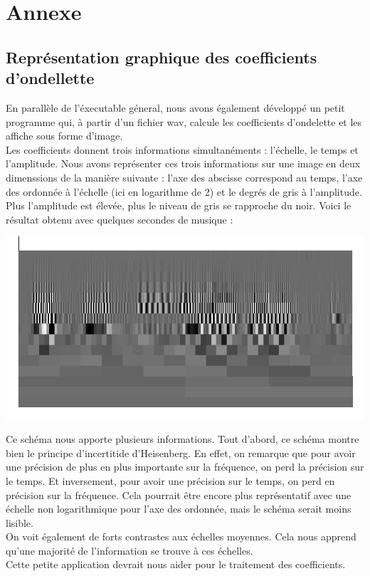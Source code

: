 \documentclass[a4paper,12pt]{article}
\begin{document}
\newpage

\section{Annexe}
	\subsection{Représentation graphique des coefficients d'ondellette}
En parallèle de l'éxecutable géneral, nous avons également développé
un petit programme qui, à partir d'un fichier wav, calcule les
coefficients d'ondelette et les affiche sous forme d'image.\\
Les coefficients donnent trois informations simultanéments :
l'échelle, le temps et l'amplitude. Nous avons représenter ces trois
informations sur une image en deux dimenssions de la manière suivante
: l'axe des abscisse correspond au temps, l'axe des ordonnée à
l'échelle (ici en logarithme de 2) et le degrés de gris à l'amplitude. Plus
l'amplitude est élevée, plus le niveau de gris se rapproche du noir.
Voici le résultat obtenu avec quelques secondes de musique :\\
\begin{center}
\includegraphics[scale=0.50]{img/coeffs.png}
\end{center}
Ce schéma nous apporte plusieurs informations. Tout d'abord, ce schéma
montre bien le principe d'incertitide d'Heisenberg. En effet, on
remarque que pour avoir une précision de plus en plus importante sur
la fréquence, on perd la précision sur le temps. Et inversement, pour
avoir une précision sur le temps, on perd en précision sur la
fréquence. Cela pourrait être encore plus représentatif avec une
échelle non logarithmique pour l'axe des ordonnée, mais le schéma
serait moins lisible.\\
On voit également de forts contrastes aux échelles moyennes. Cela nous
apprend qu'une majorité de l'information se trouve à ces échelles.
\\
Cette petite application devrait nous aider pour le traitement des
coefficients.
\end{document}
